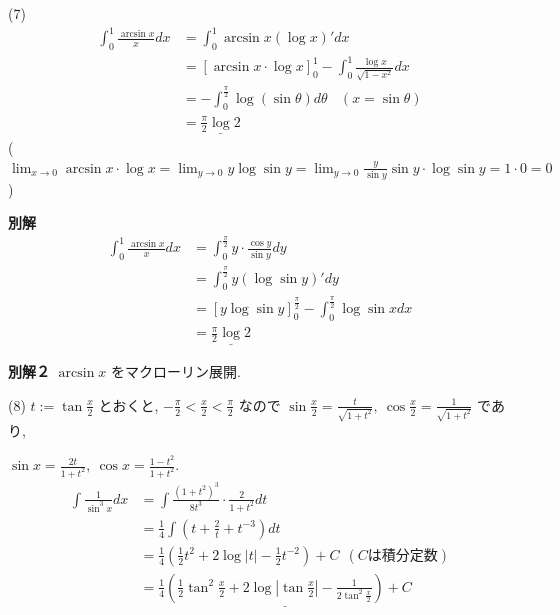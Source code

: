 \documentclass{jsarticle}
\begin{document}
\bigskip
\bigskip
\bigskip
\bigskip
\bigskip
\bigskip
\bigskip

(7)
\begin{align*}
\displaystyle \int_0^1 \frac{\arcsin x}{x} dx
&= \displaystyle \int_0^1 \arcsin x (\log x)' dx \\
&= \left[\arcsin x \cdot \log x \right]_0^1 - \displaystyle \int_0^1 \frac{\log x}{\sqrt{1-x^2}} dx \\
&= -\displaystyle \int_0^{\frac{\pi}{2}} \log(\sin \theta) d\theta　\ \ \ \ (x = \sin \theta) \\
&= \underline{\displaystyle \frac{\pi}{2} \log2}
\end{align*}
\hspace{7zw}($\displaystyle \lim_{x \to 0} \arcsin x \cdot \log x
= \lim_{y \to 0} y\log{\sin y}
= \lim_{y \to 0} \frac{y}{\sin y} \sin y \cdot \log{\sin y}
= 1\cdot0 = 0$)

\bigskip
\bigskip
\bigskip
\bigskip
\bigskip
\bigskip
\bigskip

\hspace{7zw} \textbf{別解}
\begin{align*}
\displaystyle \int_0^1 \frac{\arcsin x}{x} dx
&= \displaystyle \int_0^{\frac{\pi}{2}} y\cdot \frac{\cos y}{\sin y} dy \\
&= \displaystyle \int_0^{\frac{\pi}{2}} y(\log{\sin y})' dy \\
&= \left[y\log{\sin y} \right]_0^{\frac{\pi}{2}} - \displaystyle \int_0^{\frac{\pi}{2}} \log\sin x dx \\
&= \underline{\displaystyle \frac{\pi}{2} \log2}
\end{align*}

\bigskip

\hspace{7zw} \textbf{別解２}
$\arcsin x$ をマクローリン展開.

\bigskip
\bigskip
\bigskip
\bigskip
\bigskip
\bigskip
\bigskip
\bigskip

(8)
$t := \displaystyle \tan{\frac{x}{2}}$ とおくと, 
$\displaystyle -\frac{\pi}{2} < \frac{x}{2} < \frac{\pi}{2}$ なので $\displaystyle \sin \frac{x}{2} = \frac{t}{\sqrt{1+t^2}}, \ \cos{\frac{x}{2}} = \frac{1}{\sqrt{1+t^2}}$ であり, 

$\sin x = \displaystyle \frac{2t}{1+t^2}, \ \cos x = \frac{1-t^2}{1+t^2}$.
\begin{align*}
\displaystyle \int \frac{1}{\sin^3 x} dx
&= \displaystyle \int \frac{(1+t^2)^3}{8t^3} \cdot \frac{2}{1+t^2} dt \\
&= \displaystyle \frac{1}{4} \int \left(t + \frac{2}{t} + t^{-3} \right) dt \\
&= \displaystyle \frac{1}{4} \left(\frac{1}{2} t^2 + 2\log|t| - \frac{1}{2}t^{-2} \right) + C \ \ (Cは積分定数) \\
&= \underline{\displaystyle \frac{1}{4} \left(\frac{1}{2} \displaystyle \tan^2{\frac{x}{2}} + 2\log \left|\displaystyle \tan{\frac{x}{2}} \right| - \frac{1}{2\displaystyle \tan^{2}{\frac{x}{2}}} \right) + C}
\end{align*}
\end{document}
